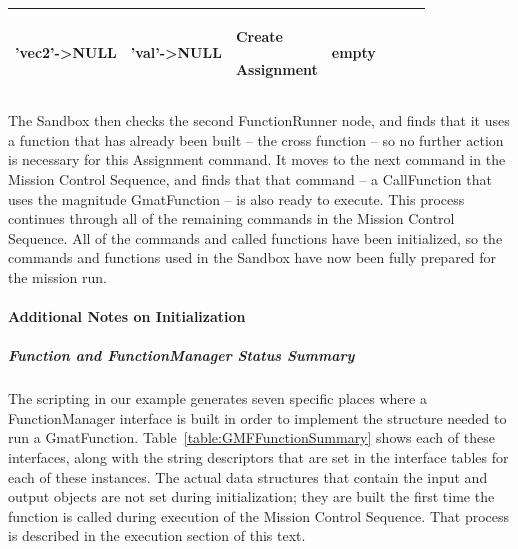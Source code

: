 \begin{center}
\begin{supertabular}{|p{0.9in}|p{0.65in}|p{0.62in}|p{0.83in}|p{0.75in}|p{0.8in}|p{0.7in}|}
\begin{small}
'vec2'->NULL
\end{small} &
\begin{small}
'val'->NULL
\end{small} &
\begin{small}
Create

Assignment
\end{small} &
\begin{small}empty\end{small}\\
\hline
\end{supertabular}
\end{center}

The Sandbox then checks the second FunctionRunner node, and finds that it uses a function that has
already been built -- the cross function -- so no further action is necessary for this Assignment
command.  It moves to the next command in the Mission Control Sequence, and finds that that command
-- a CallFunction that uses the magnitude GmatFunction -- is also ready to execute.  This process
continues through all of the remaining commands in the Mission Control Sequence.  All of the
commands and called functions have been initialized, so the commands and functions used in the
Sandbox have now been fully prepared for the mission run.

\paragraph{Additional Notes on Initialization}

\subparagraph{Function and FunctionManager Status Summary}
The scripting in our example generates seven specific places where a FunctionManager interface is
built in order to implement the structure needed to run a GmatFunction. 
Table~\ref{table:GMFFunctionSummary} shows each of these interfaces, along with the string
descriptors that are set in the interface tables for each of these instances.  The actual data
structures that contain the input and output objects are not set during initialization; they are
built the first time the function is called during execution of the Mission Control Sequence.  That
process is described in the execution section of this text.

